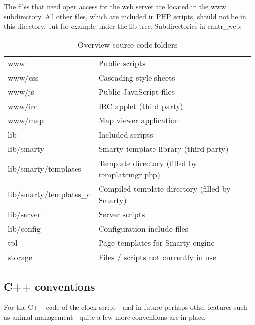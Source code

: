 \documentclass[a4paper,12pt]{article}
\begin{document}
The files that need open access for the web server are located in the www subdirectory. All other files, which are included in PHP scripts, should not be in this directory, but for example under the lib tree. Subdirectories in cantr\_web:

\begin{table}[!ht]
\colorbox{gray!20}{
\begin{minipage}{.8\textwidth}
\begin{center}

\begin{tabular}{l|p{6cm}}
www & Public scripts \\
www/css & Cascading style sheets \\
www/js & Public JavaScript files \\
www/irc & IRC applet (third party) \\
www/map & Map viewer application \\
lib & Included scripts \\
lib/smarty & Smarty template library (third party) \\
lib/smarty/templates & Template directory (filled by templatemgr.php) \\
lib/smarty/templates\_c & Compiled template directory (filled by Smarty) \\
lib/server & Server scripts \\
lib/config & Configuration include files \\
tpl & Page templates for Smarty engine \\
storage & Files / scripts not currently in use \\ 
\end{tabular}

\end{center}
\end{minipage}}
\caption{Overview source code folders}
\end{table}

\subsection{C++ conventions}

For the C++ code of the clock script - and in future perhaps other features such as animal management - quite a few more conventions are in place.
\end{document}
